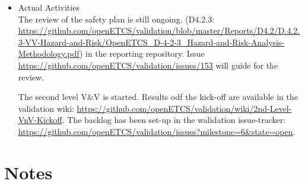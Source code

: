\documentclass[a4paper, 11pt]{article}
\begin{document}
\begin{itemize}
\item Actual Activities\\
The review of the safety plan is still ongoing. (D4.2.3: \url{https://github.com/openETCS/validation/blob/master/Reports/D4.2/D.4.2.3-VV-Hazard-and-Risk/OpenETCS_D-4-2-3_Hazard-and-Risk-Analysis-Methodology.pdf}) in the reporting repository. Issue \url{https://github.com/openETCS/validation/issues/153} will guide for the review. 

The second level V\&V is started. Results odf the kick-off are available in the validation wiki: \url{https://github.com/openETCS/validation/wiki/2nd-Level-VnV-Kickoff}. The backlog has been set-up in the walidation issue-tracker: \url{https://github.com/openETCS/validation/issues?milestone=6&state=open}.

\end{itemize}

\section{Notes}
\end{document}
